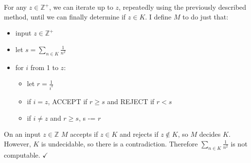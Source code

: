 \documentclass[11pt]{article}
\begin{document}
For any $z \in \mathbb{Z}^+$, we can iterate up to $z$, repeatedly using the previously described method, until we can finally determine if $z \in K$.
I define $M$ to do just that:
\begin{itemize}
	\item input $z \in \mathbb{Z}^+$
	\item let $s = \sum _{n\in K} \frac{1}{n^2}$
	\item for $i$ from 1 to $z$:
	\begin{itemize}
		\item let $r = \frac{1}{i^2}$
		\item if $i = z$, ACCEPT if $r \geq s$ and REJECT if $r < s$
		\item if $i \neq z$ and $r \geq s$, s -= $r$
	\end{itemize}
\end{itemize}

On an input $z \in \mathbb{Z}$ $M$ accepts if $z \in K$ and rejects if $z \notin K$, so $M$ decides $K$.
However, $K$ is undecidable, so there is a contradiction.
Therefore $\sum _{n \in K} \frac{1}{n^2}$ is not computable. $\checkmark$
\end{document}
